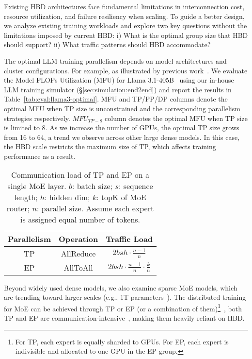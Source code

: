 Existing HBD architectures face fundamental limitations in interconnection cost, resource utilization, and failure resiliency when scaling. To guide a better design, we analyze existing training workloads and explore two key questions without the limitations imposed by current HBD: i) What is the optimal group size that HBD should support? ii) What traffic patterns should HBD accommodate?


The optimal LLM training parallelism depends on model architectures and cluster configurations. For example, as illustrated by previous work~\cite{disttrain, nsdi2025_rlhfuse}. 
We evaluate the Model FLOPs Utilization (MFU) for Llama 3.1-405B~\cite{llama3.1-405b} using our in-house LLM training simulator (\S\ref{sec:simulation:end2end}) and report the results in Table~\ref{tab:eval:llama3-optimal}. MFU and TP/PP/DP columns denote the optimal MFU when TP size is unconstrained and the corresponding parallelism strategies respectively. $MFU_{TP-8}$ column denotes the optimal MFU when TP size is limited to 8. As we increase the number of GPUs, the optimal TP size grows from 16 to 64, a trend we observe across other large dense models. 
In this case, the HBD scale restricts the maximum size of TP, which affects training performance as a result. 

\begin{table}[h!t] \small
\vspace{-2ex}
\centering
\begin{tabular}{cccc}
\toprule
\multicolumn{2}{c}{\textbf{Parallelism}} & \textbf{Operation}  & \textbf{Traffic Load}  \\
\midrule

\multicolumn{2}{c}{TP}            & AllReduce     &$2bsh\cdot\frac{n-1}{n}$ \\ 
\multicolumn{2}{c}{EP}            & AllToAll     &$2bsh\cdot\frac{n-1}{n}\cdot\frac{k}{n}$\\
\bottomrule
\end{tabular}
\caption{Communication load of TP and EP on a single MoE layer. $b$: batch size; $s$: sequence length; $h$: hidden dim; $k$: topK of MoE router; $n$: parallel size. Assume each expert is assigned equal number of tokens.}
\label{tab:workload}
\vspace{-5ex}
\end{table}

Beyond widely used dense models, we also examine sparse MoE models, which are trending toward larger scales (e.g., 1T parameters~\cite{switch_transformer}). The distributed training for MoE can be achieved through TP or EP (or a combination of them)\footnote{For TP, each expert is equally sharded to GPUs. For EP, each expert is indivisible and allocated to one GPU in the EP group.}~\cite{sigcomm2023_janus}, both TP and EP are communication-intensive~\cite{atc2023_lina}, making them heavily reliant on HBD. 







